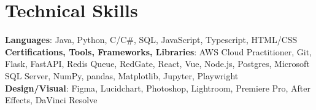 \documentclass[letterpaper,11pt]{article}
\begin{document}
%
\section{Technical Skills}
 \begin{itemize}[leftmargin=0.15in, label={}]
    \small{\item{
     \textbf{Languages}{: Java, Python, C/C\#, SQL, JavaScript, Typescript, HTML/CSS} \\
     \textbf{Certifications, Tools, Frameworks, Libraries}{: AWS Cloud Practitioner, Git, Flask, FastAPI, Redis Queue, RedGate, React, Vue, Node.js, Postgres, Microsoft SQL Server, NumPy, pandas, Matplotlib, Jupyter, Playwright} \\
     \textbf{Design/Visual}{: Figma, Lucidchart, Photoshop, Lightroom, Premiere Pro, After Effects, DaVinci Resolve}
    }}
 \end{itemize}


  
\end{document}

